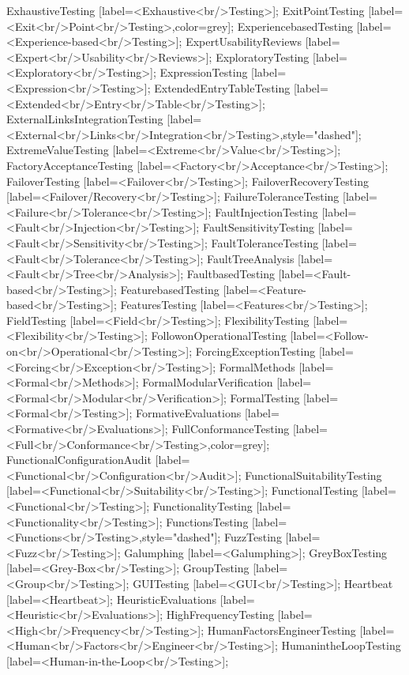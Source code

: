 \documentclass{article}
\begin{document}
{ExhaustiveTesting [label=<Exhaustive<br/>Testing>];
ExitPointTesting [label=<Exit<br/>Point<br/>Testing>,color=grey];
ExperiencebasedTesting [label=<Experience-based<br/>Testing>];
ExpertUsabilityReviews [label=<Expert<br/>Usability<br/>Reviews>];
ExploratoryTesting [label=<Exploratory<br/>Testing>];
ExpressionTesting [label=<Expression<br/>Testing>];
ExtendedEntryTableTesting [label=<Extended<br/>Entry<br/>Table<br/>Testing>];
ExternalLinksIntegrationTesting [label=<External<br/>Links<br/>Integration<br/>Testing>,style="dashed"];
ExtremeValueTesting [label=<Extreme<br/>Value<br/>Testing>];
FactoryAcceptanceTesting [label=<Factory<br/>Acceptance<br/>Testing>];
FailoverTesting [label=<Failover<br/>Testing>];
FailoverRecoveryTesting [label=<Failover/Recovery<br/>Testing>];
FailureToleranceTesting [label=<Failure<br/>Tolerance<br/>Testing>];
FaultInjectionTesting [label=<Fault<br/>Injection<br/>Testing>];
FaultSensitivityTesting [label=<Fault<br/>Sensitivity<br/>Testing>];
FaultToleranceTesting [label=<Fault<br/>Tolerance<br/>Testing>];
FaultTreeAnalysis [label=<Fault<br/>Tree<br/>Analysis>];
FaultbasedTesting [label=<Fault-based<br/>Testing>];
FeaturebasedTesting [label=<Feature-based<br/>Testing>];
FeaturesTesting [label=<Features<br/>Testing>];
FieldTesting [label=<Field<br/>Testing>];
FlexibilityTesting [label=<Flexibility<br/>Testing>];
FollowonOperationalTesting [label=<Follow-on<br/>Operational<br/>Testing>];
ForcingExceptionTesting [label=<Forcing<br/>Exception<br/>Testing>];
FormalMethods [label=<Formal<br/>Methods>];
FormalModularVerification [label=<Formal<br/>Modular<br/>Verification>];
FormalTesting [label=<Formal<br/>Testing>];
FormativeEvaluations [label=<Formative<br/>Evaluations>];
FullConformanceTesting [label=<Full<br/>Conformance<br/>Testing>,color=grey];
FunctionalConfigurationAudit [label=<Functional<br/>Configuration<br/>Audit>];
FunctionalSuitabilityTesting [label=<Functional<br/>Suitability<br/>Testing>];
FunctionalTesting [label=<Functional<br/>Testing>];
FunctionalityTesting [label=<Functionality<br/>Testing>];
FunctionsTesting [label=<Functions<br/>Testing>,style="dashed"];
FuzzTesting [label=<Fuzz<br/>Testing>];
Galumphing [label=<Galumphing>];
GreyBoxTesting [label=<Grey-Box<br/>Testing>];
GroupTesting [label=<Group<br/>Testing>];
GUITesting [label=<GUI<br/>Testing>];
Heartbeat [label=<Heartbeat>];
HeuristicEvaluations [label=<Heuristic<br/>Evaluations>];
HighFrequencyTesting [label=<High<br/>Frequency<br/>Testing>];
HumanFactorsEngineerTesting [label=<Human<br/>Factors<br/>Engineer<br/>Testing>];
HumanintheLoopTesting [label=<Human-in-the-Loop<br/>Testing>];
}
\end{document}
